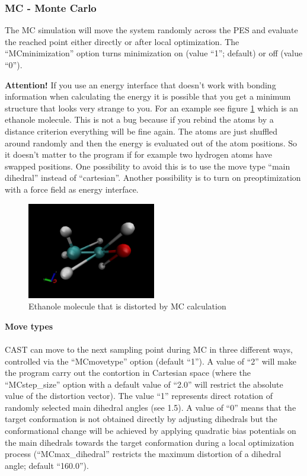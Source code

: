 \documentclass[10pt,a4paper]{article} %
\begin{document}
	\subsubsection{MC - Monte Carlo}
	The \ac{MC} simulation will move the system randomly across the \ac{PES} and evaluate the reached point either directly or after local optimization. The ``MCminimization'' option turns minimization on (value ``1''; default) or off (value ``0''). 
	
	\textbf{Attention!}
	If you use an energy interface that doesn't work with bonding information when calculating the energy it is possible that you get a minimum structure that looks very strange to you. For an example see figure \ref{fig:dist_eth} which is an ethanole molecule. This is not a bug because if you rebind the atoms by a distance criterion everything will be fine again. The atoms are just shuffled around randomly and then the energy is evaluated out of the atom positions. So it doesn't matter to the program if for example two hydrogen atoms have swapped positions. One possibility to avoid this is to use the move type ``main dihedral'' instead of ``cartesian''. Another possibility is to turn on preoptimization with a force field as energy interface.
	
		\begin{figure}[htb]
		\centering
		\includegraphics[width=0.5\textwidth]{img/distorted_ethanol.png}
		\caption{Ethanole molecule that is distorted by MC calculation}
		\label{fig:dist_eth}
	\end{figure}
	
	\textbf{Move types}\\~\\
	\ac{CAST} can move to the next sampling point during \ac{MC} in three different ways, controlled via the ``MCmovetype'' option (default ``1''). A value of ``2'' will make the program carry out the contortion in Cartesian space (where the ``MCstep\_size'' option with a default value of ``2.0'' will restrict the absolute value of the distortion vector). The value ``1'' represents direct rotation of randomly selected main dihedral angles (see 1.5). A value of ``0'' means that the target conformation is not obtained directly by adjusting dihedrals but the conformational change will be achieved by applying quadratic bias potentials on the main dihedrals towards the target conformation during a local optimization process (``MCmax\_dihedral'' restricts the maximum distortion of a dihedral angle; default ``160.0''). \\
		
\end{document}
